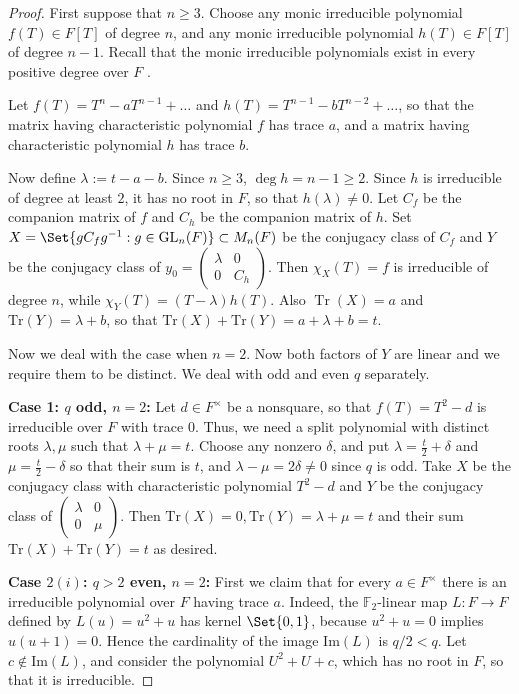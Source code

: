 \documentclass[preprint,11pt]{amsart}
\def\F{\mathbb{F}}
\theoremstyle{definition}
\numberwithin{thm}{section}
\newcommand{\Tr}{\operatorname{Tr}}
\def\F{\mathbb{F}}
\newcommand{\lam}{\lambda}
\newcommand{\tr}{\textrm{Tr}}
\newcommand{\GL}{\textrm{GL}}
\newcommand{\sub}{\subset}
\begin{document}
\begin{proof}
First suppose that $n \geq 3$. Choose any monic irreducible polynomial $f(T) \in F[T]$ of degree $n$, and any monic irreducible polynomial $h(T) \in F[T]$ of degree $n-1$. Recall that the monic irreducible polynomials exist in every positive degree over $F$ \cite{CM}. 

Let $f(T) = T^n - a T^{n-1} + \ldots$ and $h(T) = T^{n-1} - b T^{n-2} + \ldots$, so that the matrix having characteristic polynomial $f$ has trace $a$, and a matrix having characteristic polynomial $h$ has trace $b$. 

Now define $\lambda := t - a - b$. Since $n \geq 3$, $\deg h = n-1 \geq 2$. Since $h$ is irreducible of degree at least $2$, it has no root in $F$, so that $h(\lambda) \neq 0$. Let $C_f$ be the companion matrix of $f$ and $C_h$ be the companion matrix of $h$. Set $X = \Set{g C_f g^{-1} : g \in \GL_n(F)}	 \sub M_n(F)$ be the conjugacy class of $C_f$ and $Y$ be the conjugacy class of $y_0 = \begin{pmatrix} \lambda & 0  \\ 0 & C_h \end{pmatrix}$. Then $\chi_X(T) = f$ is irreducible of degree $n$, while $\chi_Y(T) = (T- \lambda) h(T)$. Also $\Tr(X) = a$ and $\tr(Y) = \lambda + b$, so that $\tr(X) + \tr(Y) = a + \lam + b = t$.



Now we deal with the case when $n = 2$.  Now both factors of $Y$ are linear and we require them to be distinct. We deal with odd and even $q$ separately. 

\noindent \textbf{Case 1: $q$ odd, $n =2$: } Let $d \in F^{\times}$ be a nonsquare, so that $f(T) = T^2 -d $ is irreducible over $F$ with trace $0$. Thus, we need a split polynomial with distinct roots $\lam, \mu$ such that $\lam + \mu = t$. Choose any nonzero $\delta$, and put $\lam = \frac{t}{2} + \delta$ and $\mu = \frac{t}{2}- \delta$ so that their sum is $t$, and $\lam -\mu = 2 \delta \neq 0$ since $q$ is odd. Take $X$ be the conjugacy class with characteristic polynomial $T^2 - d$ and $Y$ be the conjugacy class of $\begin{pmatrix} \lam & 0 \\ 0 & \mu \end{pmatrix}$. Then $\tr(X) =0, \tr(Y) = \lam + \mu = t$ and their sum $\tr(X) + \tr(Y) = t$ as desired. 

\noindent \textbf{Case $2(i)$: $q > 2$ even, $n = 2$:} First we claim that for every $a \in F^{\times}$ there is an irreducible polynomial over $F$ having trace $a$. Indeed, the $\F_2$-linear map $L : F \to F$ defined by $L(u) = u^2 + u$ has kernel $\Set{0,1}$, because $u^2 +u = 0$ implies $u(u+1) = 0$.  Hence the cardinality of the image $\textrm{Im}(L)$ is $q/2 < q$. Let $c \not \in \textrm{Im}(L)$, and consider the polynomial $U^2 + U + c$, which has no root in $F$, so that it is irreducible.  


\end{proof}
\end{document}
